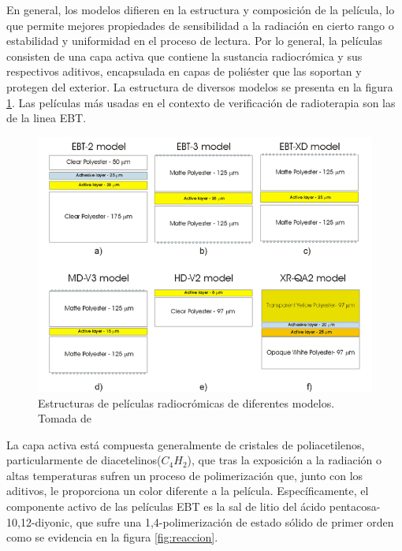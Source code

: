 En general, los modelos difieren en la estructura y composición de la película, lo que permite mejores propiedades de sensibilidad a la radiación en cierto rango o estabilidad y uniformidad en el proceso de lectura. Por lo general, la películas consisten de una capa activa que contiene la sustancia radiocrómica y sus respectivos aditivos, encapsulada en capas de poliéster que las soportan y protegen del exterior. La estructura de diversos modelos se presenta en la figura \ref{fig:Estructuras}. Las películas más usadas en el contexto de verificación de radioterapia son las de la linea EBT\cite{Devic2016}.\\
\begin{figure}[H]
	\centering
	\includegraphics[width=\linewidth]{images/modelos.png}
	\caption{Estructuras de películas radiocrómicas de diferentes modelos. Tomada de \cite{Devic2016}}
	\label{fig:Estructuras}
\end{figure}

La capa activa está compuesta generalmente de cristales de poliacetilenos\cite{Williams2011}, particularmente de diacetelinos($C_4H_2$), que tras la exposición a la radiación o altas temperaturas sufren un proceso de polimerización que, junto con los aditivos, le proporciona un color diferente a la película. Específicamente, el componente activo de las películas EBT es la sal de litio del ácido pentacosa-10,12-diyonic, que sufre una 1,4-polimerización de estado sólido de primer orden como se evidencia en la figura \ref{fig:reaccion}.\\  

